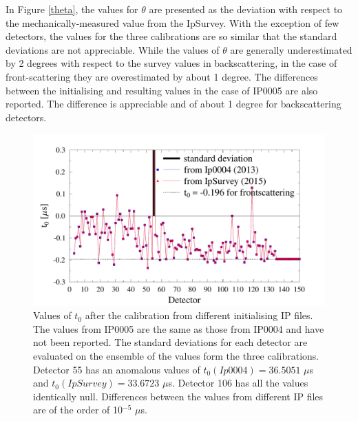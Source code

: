 \documentclass[11pt,a4paper,oneside]{article}
\begin{document}
In Figure \ref{theta}, the values for $\theta$ are presented as the deviation with respect to the mechanically-measured value from  the IpSurvey. With the exception of few detectors, the values for the three calibrations are so similar that the standard deviations are not appreciable. While the values of $\theta$ are generally underestimated by 2 degrees with respect to the survey values in backscattering, in the case of front-scattering they are overestimated by about 1 degree. The differences between the initialising and resulting values in the case of IP0005 are also reported. The difference is appreciable and of about 1 degree for backscattering detectors.

\begin{figure}
\centering
\includegraphics[width=\textwidth]{img/t0}
\caption{Values of $t_0$ after the calibration from different initialising IP files. The values from  IP0005 are the same as those from IP0004 and have not been reported. The standard deviations for each detector are evaluated on the ensemble of the values form the three calibrations. Detector 55 has an anomalous values of $t_0(Ip0004)= 36.5051$ $\mu$s and	$t_0(IpSurvey)=33.6723$ $\mu$s. Detector 106 has all the values identically null. Differences between the values from different IP files are of the order of 10$^{-5}$ $\mu$s.}
\label{t0}
\end{figure}
\end{document}
